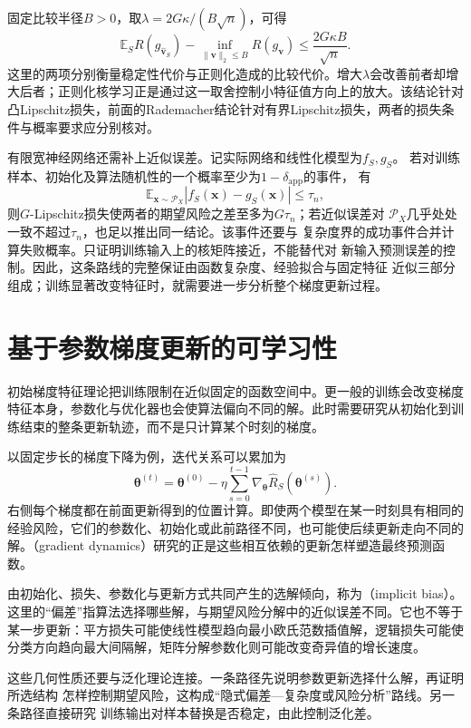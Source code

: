 固定比较半径$B>0$，取$\lambda=2G\kappa/(B\sqrt n)$，可得
\begin{equation}
 \mathbb E_S R(g_{\widehat{\bm v}_S})
 -\inf_{\|\bm v\|_2\leq B}R(g_{\bm v})
 \leq\frac{2G\kappa B}{\sqrt n}.
 \label{eq:ntk-sample-risk}
\end{equation}
这里的两项分别衡量稳定性代价与正则化造成的比较代价。增大$\lambda$会改善前者却增大后者；正则化核学习正是通过这一取舍控制小特征值方向上的放大。该结论针对凸Lipschitz损失，前面的Rademacher结论针对有界Lipschitz损失，两者的损失条件与概率要求应分别核对。

有限宽神经网络还需补上近似误差。记实际网络和线性化模型为$f_S,g_S$。
若对训练样本、初始化及算法随机性的一个概率至少为$1-\delta_{\mathrm{app}}$的事件，
有
\[
 \mathbb E_{\bm x\sim\mathcal P_X}|f_S(\bm x)-g_S(\bm x)|\leq\tau_n,
\]
则$G$-Lipschitz损失使两者的期望风险之差至多为$G\tau_n$；若近似误差对
$\mathcal P_X$几乎处处一致不超过$\tau_n$，也足以推出同一结论。该事件还要与
复杂度界的成功事件合并计算失败概率。只证明训练输入上的核矩阵接近，不能替代对
新输入预测误差的控制。因此，这条路线的完整保证由函数复杂度、经验拟合与固定特征
近似三部分组成；训练显著改变特征时，就需要进一步分析整个梯度更新过程。

\section{基于参数梯度更新的可学习性}
\label{sec:implicit-bias}

初始梯度特征理论把训练限制在近似固定的函数空间中。更一般的训练会改变梯度特征本身，参数化与优化器也会使算法偏向不同的解。此时需要研究从初始化到训练结束的整条更新轨迹，而不是只计算某个时刻的梯度。

以固定步长的梯度下降为例，迭代关系可以累加为
\[
 \bm\theta^{(t)}=\bm\theta^{(0)}
 -\eta\sum_{s=0}^{t-1}\nabla_{\bm\theta}\hat R_S(\bm\theta^{(s)}).
\]
右侧每个梯度都在前面更新得到的位置计算。即使两个模型在某一时刻具有相同的经验风险，它们的参数化、初始化或此前路径不同，也可能使后续更新走向不同的解。（gradient dynamics）研究的正是这些相互依赖的更新怎样塑造最终预测函数。

由初始化、损失、参数化与更新方式共同产生的选解倾向，称为（implicit bias）。这里的“偏差”指算法选择哪些解，与期望风险分解中的近似误差不同。它也不等于某一步更新：平方损失可能使线性模型趋向最小欧氏范数插值解，逻辑损失可能使分类方向趋向最大间隔解，矩阵分解参数化则可能改变奇异值的增长速度。

这些几何性质还要与泛化理论连接。一条路径先说明参数更新选择什么解，再证明所选结构
怎样控制期望风险，这构成“隐式偏差—复杂度或风险分析”路线。另一条路径直接研究
训练输出对样本替换是否稳定，由此控制泛化差。

